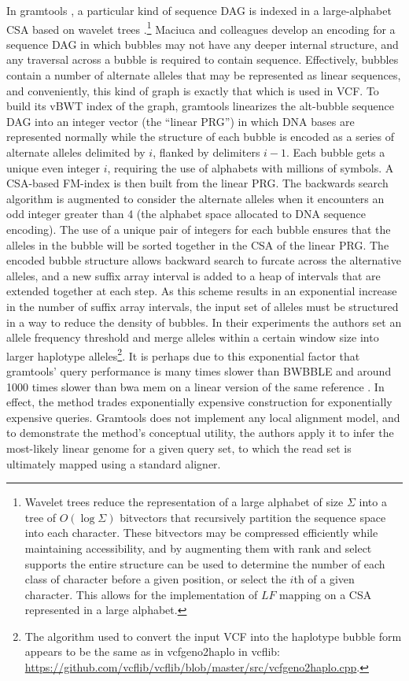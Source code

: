 \documentclass[a4paper,12pt,numbered,oneside]{Classes/PhDThesisPSnPDF}
\begin{document}
In gramtools \cite{maciuca2016natural}, a particular kind of sequence DAG is indexed in a large-alphabet CSA based on wavelet trees \cite{grossi2003high}.\footnote{Wavelet trees reduce the representation of a large alphabet of size $\Sigma$ into a tree of $O(\log{\Sigma})$ bitvectors that recursively partition the sequence space into each character.
These bitvectors may be compressed efficiently while maintaining accessibility, and by augmenting them with rank and select supports the entire structure can be used to determine the number of each class of character before a given position, or select the $i$th of a given character.
This allows for the implementation of $LF$ mapping on a CSA represented in a large alphabet.}
Maciuca and colleagues develop an encoding for a sequence DAG in which bubbles may not have any deeper internal structure, and any traversal across a bubble is required to contain sequence.
Effectively, bubbles contain a number of alternate alleles that may be represented as linear sequences, and conveniently, this kind of graph is exactly that which is used in VCF.
To build its vBWT index of the graph, gramtools linearizes the alt-bubble sequence DAG into an integer vector (the ``linear PRG'') in which DNA bases are represented normally while the structure of each bubble is encoded as a series of alternate alleles delimited by $i$, flanked by delimiters $i-1$.
Each bubble gets a unique even integer $i$, requiring the use of alphabets with millions of symbols.
A CSA-based FM-index is then built from the linear PRG.
The backwards search algorithm is augmented to consider the alternate alleles when it encounters an odd integer greater than 4 (the alphabet space allocated to DNA sequence encoding).
The use of a unique pair of integers for each bubble ensures that the alleles in the bubble will be sorted together in the CSA of the linear PRG.
The encoded bubble structure allows backward search to furcate across the alternative alleles, and a new suffix array interval is added to a heap of intervals that are extended together at each step.
As this scheme results in an exponential increase in the number of suffix array intervals, the input set of alleles must be structured in a way to reduce the density of bubbles.
In their experiments the authors set an allele frequency threshold and merge alleles within a certain window size into larger haplotype alleles\footnote{The algorithm used to convert the input VCF into the haplotype bubble form appears to be the same as in vcfgeno2haplo in vcflib: \url{https://github.com/vcflib/vcflib/blob/master/src/vcfgeno2haplo.cpp}.}.
It is perhaps due to this exponential factor that gramtools' query performance is many times slower than BWBBLE and around 1000 times slower than bwa mem on a linear version of the same reference \cite{maciuca2016natural}.
In effect, the method trades exponentially expensive construction for exponentially expensive queries.
Gramtools does not implement any local alignment model, and to demonstrate the method's conceptual utility, the authors apply it to infer the most-likely linear genome for a given query set, to which the read set is ultimately mapped using a standard aligner.
\end{document}
